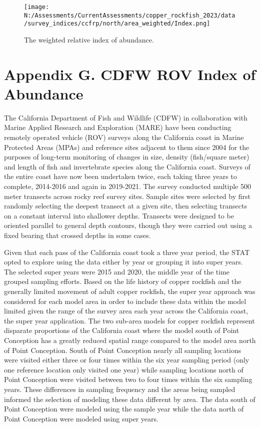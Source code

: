 \documentclass[11pt,
  english,
  letterpaper,
]{article}
\begin{document}
\newpage

\begin{figure}
\centering
\texttt{[image: N:/Assessments/CurrentAssessments/copper\_rockfish\_2023/data/survey\_indices/ccfrp/north/area\_weighted/Index.png]}
\caption{The weighted relative index of abundance.\label{fig:ccfrp-index}}
\end{figure}

\hypertarget{cdfw-rov-index}{%
\section{Appendix G. CDFW ROV Index of Abundance}\label{cdfw-rov-index}}

The California Department of Fish and Wildlife (CDFW) in collaboration with Marine Applied Research and Exploration (MARE) have been conducting remotely operated vehicle (ROV) surveys along the California coast in Marine Protected Areas (MPAs) and reference sites adjacent to them since 2004 for the purposes of long-term monitoring of changes in size, density (fish/square meter) and length of fish and invertebrate species along the California coast. Surveys of the entire coast have now been undertaken twice, each taking three years to complete, 2014-2016 and again in 2019-2021. The survey conducted multiple 500 meter transects across rocky reef survey sites. Sample sites were selected by first randomly selecting the deepest transect at a given site, then selecting transects on a constant interval into shallower depths. Transects were designed to be oriented parallel to general depth contours, though they were carried out using a fixed bearing that crossed depths in some cases.

Given that each pass of the California coast took a three year period, the STAT opted to explore using the data either by year or grouping it into super years. The selected super years were 2015 and 2020, the middle year of the time grouped sampling efforts. Based on the life history of copper rockfish and the generally limited movement of adult copper rockfish, the super year approach was considered for each model area in order to include these data within the model limited given the range of the survey area each year across the California coast, the super year application. The two sub-area models for copper rockfish represent disparate proportions of the California coast where the model south of Point Conception has a greatly reduced spatial range compared to the model area north of Point Conception. South of Point Conception nearly all sampling locations were visited either three or four times within the six year sampling period (only one reference location only visited one year) while sampling locations north of Point Conception were visited between two to four times within the six sampling years. These differences in sampling frequency and the areas being sampled informed the selection of modeling these data different by area. The data south of Point Conception were modeled using the sample year while the data north of Point Conception were modeled using super years.
\end{document}
